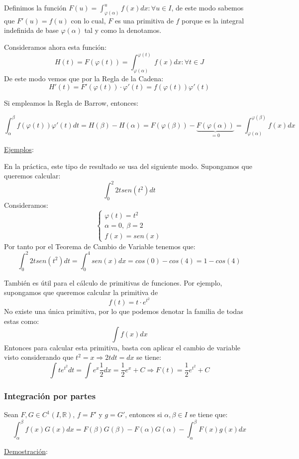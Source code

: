\documentclass[10pt,a4paper,openright]{book}
\begin{document}
Definimos la función $F(u)=\int_{\varphi(\alpha)}^{u} f(x)dx: \forall u \in I$, de este modo sabemos que $F'(u)=f(u)$ con lo cual, $F$ es una primitiva de $f$ porque es la integral indefinida de base $\varphi(\alpha)$ tal y como la denotamos.

Consideramos ahora esta función:
$$H(t)=F(\varphi(t))=\int_{\varphi(\alpha)}^{\varphi(t)} f(x)dx: \forall t\in J$$
De este modo vemos que por la Regla de la Cadena:
$$H'(t)=F'(\varphi(t))\cdot \varphi'(t)= f(\varphi(t))\varphi'(t)$$

Si empleamos la Regla de Barrow, entonces:

$$\int_{\alpha}^{\beta} f(\varphi(t)) \varphi ' (t) dt = H (\beta) - H(\alpha) = F(\varphi(\beta)) - \underbrace{F(\varphi(\alpha))}_{= 0} =  \int_{\varphi (\alpha)}^{\varphi (\beta)} f(x) dx$$

\underline{Ejemplos}:

En la práctica, este tipo de resultado se usa del siguiente modo. Supongamos que queremos calcular:
$$\int_{0}^{2} 2tsen(t^2)dt$$
Consideramos:
$$\begin{cases} \varphi(t)=t^2 \\ \alpha = 0, \ \beta = 2 \\
f(x)=sen(x)\end{cases}$$
Por tanto por el Teorema de Cambio de Variable tenemos que:
$$\int_{0}^{2} 2tsen(t^2)dt = \int_{0}^{4} sen(x)dx = cos(0)-cos(4)= 1-cos(4)$$

También es útil para el cálculo de primitivas de funciones. Por ejemplo, supongamos que queremos calcular la primitiva de
$$f(t)=t\cdot e^{t^2}$$
No existe una única primitiva, por lo que podemos denotar la familia de todas estas como:
$$\int f(x)dx$$
Entonces para calcular esta primitiva, basta con aplicar el cambio de variable visto considerando que $ t^2 = x \Rightarrow 2tdt=dx$ se tiene:
$$\int t e^{t^2} dt  = \int e^x \frac{1}{2} dx = \frac{1}{2} e^x + C \Rightarrow F(t)=\frac{1}{2}e^{t^2} + C$$

\subsubsection*{Integración por partes}
Sean $F,G\in C^1(I,\mathbb R)$, $f=F'$ y $g=G'$, entonces si $\alpha,\beta\in I$ se tiene que:
$$\int_{\alpha}^{\beta} f(x)G(x)dx = F(\beta)G(\beta) - F(\alpha)G(\alpha)-\int_{\alpha}^{\beta} F(x)g(x)dx$$

\underline{Demostración}:
\end{document}
